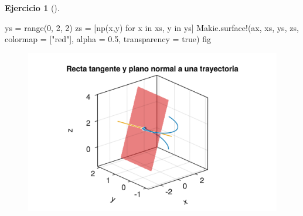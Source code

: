 \documentclass[
  a4paper,
]{scrreport}
\newenvironment{Shaded}{\begin{snugshade}}{\end{snugshade}}
\newcommand{\ConstantTok}[1]{\textcolor[rgb]{0.56,0.35,0.01}{#1}}
\newcommand{\FloatTok}[1]{\textcolor[rgb]{0.68,0.00,0.00}{#1}}
\newcommand{\FunctionTok}[1]{\textcolor[rgb]{0.28,0.35,0.67}{#1}}
\newcommand{\KeywordTok}[1]{\textcolor[rgb]{0.00,0.23,0.31}{#1}}
\newcommand{\NormalTok}[1]{\textcolor[rgb]{0.00,0.23,0.31}{#1}}
\newcommand{\OperatorTok}[1]{\textcolor[rgb]{0.37,0.37,0.37}{#1}}
\newcommand{\StringTok}[1]{\textcolor[rgb]{0.13,0.47,0.30}{#1}}
\theoremstyle{definition}
\newtheorem{exercise}{Ejercicio}[chapter]
\theoremstyle{remark}
\begin{document}
\begin{exercise}[]
\begin{enumerate}
\begin{tcolorbox}
\begin{Shaded}
\begin{Highlighting}[]
\NormalTok{ys }\OperatorTok{=} \FunctionTok{range}\NormalTok{(}\FloatTok{0}\NormalTok{, }\FloatTok{2}\NormalTok{, }\FloatTok{2}\NormalTok{)}
\NormalTok{zs }\OperatorTok{=}\NormalTok{ [}\FunctionTok{np}\NormalTok{(x,y) for x }\KeywordTok{in}\NormalTok{ xs, y }\KeywordTok{in}\NormalTok{ ys]}
\NormalTok{Makie.}\FunctionTok{surface!}\NormalTok{(ax, xs, ys, zs, colormap }\OperatorTok{=}\NormalTok{ [}\StringTok{"red"}\NormalTok{], alpha }\OperatorTok{=} \FloatTok{0.5}\NormalTok{, transparency }\OperatorTok{=} \ConstantTok{true}\NormalTok{)}
\NormalTok{fig}
\end{Highlighting}
\end{Shaded}

  \begin{figure}[H]

  {\centering \includegraphics{08-funciones-vectoriales_files/figure-pdf/cell-16-output-1.png}

  }

  \end{figure}

  \end{tcolorbox}
\end{enumerate}

\end{exercise}
\end{document}
